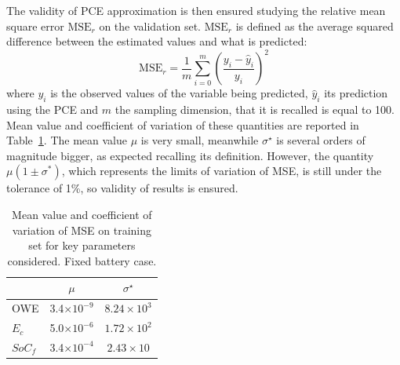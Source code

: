 The validity of PCE approximation is then ensured studying the relative mean square error $\textrm{MSE}_r$ on the validation set.
$\textrm{MSE}_r$ is defined as the average squared difference between the estimated values and what is predicted:
\begin{equation}
\textrm{MSE}_r=\frac{1}{m}\sum_{i=0}^{m}\left(\frac{y_i-\hat{y}_i}{y_i}\right)^2
\label{eq:mse}
\end{equation}
where $y_i$ is the observed values of the variable being predicted, $\hat{y}_i$ its prediction using the PCE and $m$ the sampling dimension, that it is recalled is equal to 100.
Mean value and coefficient of variation of these quantities are reported in Table~\ref{tab:mse_sens_fix_batt}.  
The mean value $\mu$ is very small, meanwhile $\sigma^\star$ is several orders of magnitude bigger, as expected recalling its definition. However, the quantity $\mu(1\pm\sigma^*)$, which represents the limits of variation of MSE, is still under the tolerance of 1\%, so validity of results is ensured. 
\begin{table}[!h]
	\centering
	\begin{tabular}{l c c}
		\cline{2-3} 
		& $\mu$ & $\sigma^\star$ \\
		\hline
		OWE & 3.4$\times10^{-9}$ & $8.24\times10^{3}$ \\
		$E_c$ & 5.0$\times10^{-6}$ & $1.72\times10^{2}$  \\
		$SoC_{f}$ & 3.4$\times10^{-4}$ & $2.43\times10$ \\
		\hline
	\end{tabular}
	\caption{Mean value and coefficient of variation of MSE on training set for key parameters considered. Fixed battery case.}
	\label{tab:mse_sens_fix_batt}
\end{table} 


